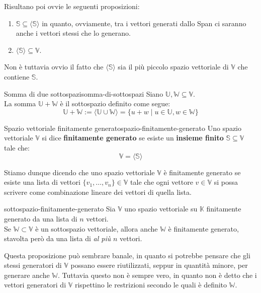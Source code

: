 \documentclass[12pt]{report}
\newcommand{\K}{\mathbb{K}}
\newcommand{\V}{\mathbb{V}}
\newcommand{\W}{\mathbb{W}}
\newcommand{\vectorspace}[1]{\mathbb{#1}}
\newcommand{\vectors}[1]{#1_1, \dots, #1_n}
\begin{document}
	Risultano poi ovvie le seguenti proposizioni:
	\begin{enumerate}
		\item $\mathbb{S} \subseteq \langle\mathbb{S}\rangle$ in quanto, ovviamente, tra i vettori generati dallo Span ci saranno anche i vettori stessi che lo generano.
		\item $\langle\mathbb{S}\rangle \subseteq \V$.
	\end{enumerate}
	
	Non è tuttavia ovvio il fatto che $\langle\mathbb{S}\rangle$ sia il più piccolo spazio vettoriale di $\V$ che contiene $\mathbb{S}$.
	
	\begin{definizione}{Somma di due sottospazi}{somma-di-sottospazi}
		Siano $\vectorspace{U}, \W \subseteq \V$.\\
		La somma $\vectorspace{U}+\W$ è il sottospazio definito come segue:
		\[
			\vectorspace{U}+\W := \langle\vectorspace{U}\cup\W\rangle = \{u+w \mid u\in\vectorspace{U}, w \in \W\}
		\]
	\end{definizione}
	
	\begin{definizione}{Spazio vettoriale finitamente generato}{spazio-finitamente-generato}
		Uno spazio vettoriale $\V$ si dice \textbf{finitamente generato} se esiste un \textbf{insieme finito} $\mathbb{S} \subseteq \V$ tale che:
		\[
			\V = \langle\mathbb{S}\rangle
		\]
	\end{definizione}
	Stiamo dunque dicendo che uno spazio vettoriale $\V$ è finitamente generato se esiste una lista di vettori $\{\vectors{v}\} \in \V$ tale che ogni vettore $v \in \V$ si possa scrivere come combinazione lineare dei vettori di quella lista.
	
	\begin{proposizione}{}{sottospazio-finitamente-generato}
		Sia $\V$ uno spazio vettoriale su $\K$ finitamente generato da una lista di $n$ vettori.\\
		Se $\W \subset \V$ è un sottospazio vettoriale, allora anche $\W$ è finitamente generato, stavolta però da una lista di \textit{al più} $n$ vettori.
	\end{proposizione}
	Questa proposizione può sembrare banale, in quanto si potrebbe pensare che gli stessi generatori di $\V$ possano essere riutilizzati, seppur in quantità minore, per generare anche $\W$. Tuttavia questo non è sempre vero, in quanto non è detto che i vettori generatori di $\V$ rispettino le restrizioni secondo le quali è definito $\W$.
	
\end{document}
